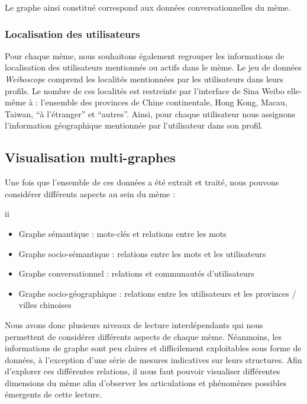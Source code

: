 Le graphe ainsi constitu\'e correspond aux donn\'ees conversationnelles
du m\`eme.

\subsubsection{Localisation des utilisateurs}

Pour chaque m\`eme, nous souhaitons \'egalement regrouper les
informations de localisation des utilisateurs mentionn\'es ou actifs
dans le m\`eme. Le jeu de donn\'ees \textit{Weiboscope }comprend les
localit\'es mentionn\'ees par les utilisateurs dans leurs profils. Le
nombre de ces localit\'es est restreinte par
l{\textquoteright}interface de Sina Weibo elle-m\^eme \`a :
l{\textquoteright}ensemble des provinces de Chine continentale, Hong
Kong, Macau, Taiwan, {\textquotedblleft}\`a
l{\textquoteright}\'etranger{\textquotedblright} et
{\textquotedblleft}autres{\textquotedblright}. Ainsi, pour chaque
utilisateur nous assignons l{\textquoteright}information g\'eographique
mentionn\'ee par l{\textquoteright}utilisateur dans son profil.

\subsection{Visualisation multi-graphes}
Une fois que l{\textquoteright}ensemble de ces donn\'ees a \'et\'e
extrait et trait\'e, nous pouvons consid\'erer diff\'erents aspects au
sein du m\`eme :

ii
\begin{itemize}
\item Graphe s\'emantique : mots-cl\'es et relations entre les mots
\item Graphe socio-s\'emantique : relations entre les mots et les
utilisateurs
\item Graphe conversationnel : relations et communaut\'es
d{\textquoteright}utilisateurs 
\item Graphe socio-g\'eographique : relations entre les utilisateurs et
les provinces / villes chinoises
\end{itemize}
Nous avons donc plusieurs niveaux de lecture interd\'ependants qui nous
permettent de consid\'erer diff\'erents aspects de chaque m\`eme.
N\'eanmoins, les informations de graphe sont peu claires et
difficilement exploitables sous forme de donn\'ees, \`a
l{\textquoteright}exception d{\textquoteright}une s\'erie de mesures
indicatives sur leurs structures. Afin d{\textquoteright}explorer ces
diff\'erentes relations, il nous faut pouvoir visualiser diff\'erentes
dimensions du m\`eme afin d{\textquoteright}observer les articulations
et ph\'enom\`enes possibles \'emergents de cette lecture. 

